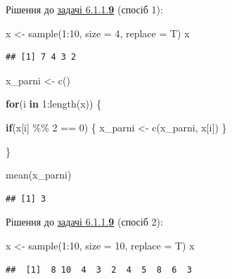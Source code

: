 \documentclass[
]{book}
\newenvironment{Shaded}{\begin{snugshade}}{\end{snugshade}}
\newcommand{\AttributeTok}[1]{\textcolor[rgb]{0.77,0.63,0.00}{#1}}
\newcommand{\ControlFlowTok}[1]{\textcolor[rgb]{0.13,0.29,0.53}{\textbf{#1}}}
\newcommand{\DecValTok}[1]{\textcolor[rgb]{0.00,0.00,0.81}{#1}}
\newcommand{\FunctionTok}[1]{\textcolor[rgb]{0.00,0.00,0.00}{#1}}
\newcommand{\NormalTok}[1]{#1}
\newcommand{\OtherTok}[1]{\textcolor[rgb]{0.56,0.35,0.01}{#1}}
\newcommand{\SpecialCharTok}[1]{\textcolor[rgb]{0.00,0.00,0.00}{#1}}
\begin{document}
Рішення до \protect\hyperlink{task6119}{задачі 6.1.1.\textbf{9}} (спосіб 1):

\begin{Shaded}
\begin{Highlighting}[]
\NormalTok{x }\OtherTok{\textless{}{-}} \FunctionTok{sample}\NormalTok{(}\DecValTok{1}\SpecialCharTok{:}\DecValTok{10}\NormalTok{, }\AttributeTok{size =} \DecValTok{4}\NormalTok{, }\AttributeTok{replace =}\NormalTok{ T)}
\NormalTok{x}
\end{Highlighting}
\end{Shaded}

\begin{verbatim}
## [1] 7 4 3 2
\end{verbatim}

\begin{Shaded}
\begin{Highlighting}[]
\NormalTok{x\_parni }\OtherTok{\textless{}{-}} \FunctionTok{c}\NormalTok{()}

\ControlFlowTok{for}\NormalTok{(i }\ControlFlowTok{in} \DecValTok{1}\SpecialCharTok{:}\FunctionTok{length}\NormalTok{(x)) \{}
  
  \ControlFlowTok{if}\NormalTok{(x[i] }\SpecialCharTok{\%\%} \DecValTok{2} \SpecialCharTok{==} \DecValTok{0}\NormalTok{) \{}
\NormalTok{    x\_parni }\OtherTok{\textless{}{-}} \FunctionTok{c}\NormalTok{(x\_parni, x[i])}
\NormalTok{  \}}
  
\NormalTok{\}}

\FunctionTok{mean}\NormalTok{(x\_parni)}
\end{Highlighting}
\end{Shaded}

\begin{verbatim}
## [1] 3
\end{verbatim}

Рішення до \protect\hyperlink{task6119}{задачі 6.1.1.\textbf{9}} (спосіб 2):

\begin{Shaded}
\begin{Highlighting}[]
\NormalTok{x }\OtherTok{\textless{}{-}} \FunctionTok{sample}\NormalTok{(}\DecValTok{1}\SpecialCharTok{:}\DecValTok{10}\NormalTok{, }\AttributeTok{size =} \DecValTok{10}\NormalTok{, }\AttributeTok{replace =}\NormalTok{ T)}
\NormalTok{x}
\end{Highlighting}
\end{Shaded}

\begin{verbatim}
##  [1]  8 10  4  3  2  4  5  8  6  3
\end{verbatim}
\end{document}
